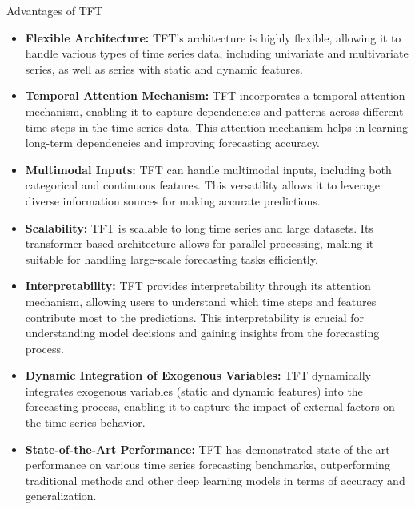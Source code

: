 \begin{frame}{Advantages of TFT}
	\begin{itemize}
		\item \textbf{Flexible Architecture:} TFT's architecture is highly flexible, allowing it to handle various types of time series data, including univariate and multivariate series, as well as series with static and dynamic features.
		
		\item \textbf{Temporal Attention Mechanism:} TFT incorporates a temporal attention mechanism, enabling it to capture dependencies and patterns across different time steps in the time series data. This attention mechanism helps in learning long-term dependencies and improving forecasting accuracy.
		
		\item \textbf{Multimodal Inputs:} TFT can handle multimodal inputs, including both categorical and continuous features. This versatility allows it to leverage diverse information sources for making accurate predictions.

		\item \textbf{Scalability:} TFT is scalable to long time series and large datasets. Its transformer-based architecture allows for parallel processing, making it suitable for handling large-scale forecasting tasks efficiently.
		\end{itemize}	
\end{frame}
	
	
		\begin{frame}
				\begin{itemize}
		\item \textbf{Interpretability:} TFT provides interpretability through its attention mechanism, allowing users to understand which time steps and features contribute most to the predictions. This interpretability is crucial for understanding model decisions and gaining insights from the forecasting process.
		
		\item \textbf{Dynamic Integration of Exogenous Variables:} TFT dynamically integrates exogenous variables (static and dynamic features) into the forecasting process, enabling it to capture the impact of external factors on the time series behavior.
		
		\item \textbf{State-of-the-Art Performance:} TFT has demonstrated state of the art performance on various time series forecasting benchmarks, outperforming traditional methods and other deep learning models in terms of accuracy and generalization.
	\end{itemize}	
\end{frame}

